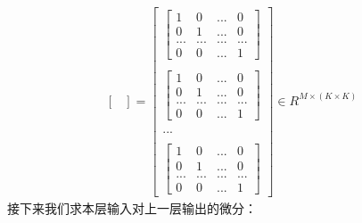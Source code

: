 \documentclass[UTF8]{article}
\begin{document}
\begin{equation}
\begin{aligned}
\begin{bmatrix}
\end{bmatrix}
= \begin{bmatrix}
\begin{bmatrix}
 1 & 0 & ... & 0 \\
 0 & 1 & ... & 0 \\
 ... & ... & ... & ... \\
 0 & 0 & ... & 1
 \end{bmatrix} \\ \\
\begin{bmatrix}
 1 & 0 & ... & 0 \\
 0 & 1 & ... & 0 \\
 ... & ... & ... & ... \\
 0 & 0 & ... & 1
 \end{bmatrix} \\ \\
 ... \\ \\
 \begin{bmatrix}
 1 & 0 & ... & 0 \\
 0 & 1 & ... & 0 \\
 ... & ... & ... & ... \\
 0 & 0 & ... & 1
 \end{bmatrix}
\end{bmatrix} \in R^{M \times (K \times K)}
\end{aligned}
\label{mlp-leaky-relu-pZ-pb-def}
\end{equation}
接下来我们求本层输入对上一层输出的微分：
\end{document}
